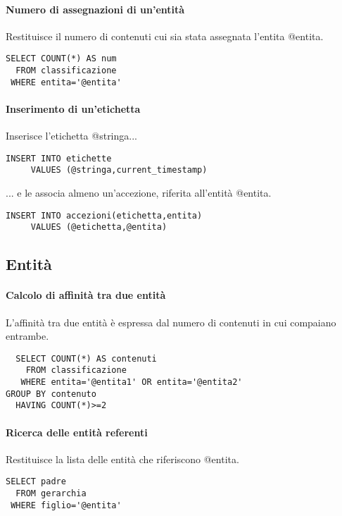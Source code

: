 \paragraph{Numero di assegnazioni di un'entità}
Restituisce il numero di contenuti cui sia stata assegnata l'entita \textsf{@entita}.

\begin{verbatim}
SELECT COUNT(*) AS num
  FROM classificazione
 WHERE entita='@entita'
\end{verbatim}

\paragraph{Inserimento di un'etichetta}
Inserisce l'etichetta \textsf{@stringa}...
	
\begin{verbatim}
INSERT INTO etichette
     VALUES (@stringa,current_timestamp)
\end{verbatim}

... e le associa almeno un'accezione, riferita all'entità \textsf{@entita}.

\begin{verbatim}
INSERT INTO accezioni(etichetta,entita)
     VALUES (@etichetta,@entita)
\end{verbatim}
	
\subsection*{Entità}
	
\paragraph{Calcolo di affinità tra due entità}
L'affinità tra due entità è espressa dal numero di contenuti in cui compaiano entrambe.
\begin{verbatim}
  SELECT COUNT(*) AS contenuti
    FROM classificazione
   WHERE entita='@entita1' OR entita='@entita2'
GROUP BY contenuto
  HAVING COUNT(*)>=2
\end{verbatim}

\paragraph{Ricerca delle entità referenti}
Restituisce la lista delle entità che riferiscono \textsf{@entita}.
\begin{verbatim}
SELECT padre
  FROM gerarchia
 WHERE figlio='@entita'
\end{verbatim}

